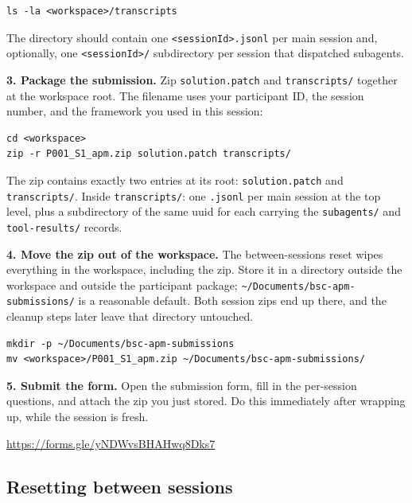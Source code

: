 \documentclass[11pt, a4paper]{article}
\begin{document}
\begin{verbatim}
ls -la <workspace>/transcripts
\end{verbatim}

The directory should contain one \texttt{<sessionId>.jsonl} per main session and, optionally, one \texttt{<sessionId>/} subdirectory per session that dispatched subagents.

\textbf{3. Package the submission.} Zip \texttt{solution.patch} and \texttt{transcripts/} together at the workspace root. The filename uses your participant ID, the session number, and the framework you used in this session:

\begin{verbatim}
cd <workspace>
zip -r P001_S1_apm.zip solution.patch transcripts/
\end{verbatim}

The zip contains exactly two entries at its root: \texttt{solution.patch} and \texttt{transcripts/}. Inside \texttt{transcripts/}: one \texttt{.jsonl} per main session at the top level, plus a subdirectory of the same uuid for each carrying the \texttt{subagents/} and \texttt{tool-results/} records.

\textbf{4. Move the zip out of the workspace.} The between-sessions reset wipes everything in the workspace, including the zip. Store it in a directory outside the workspace and outside the participant package; \texttt{\textasciitilde/Documents/bsc-apm-submissions/} is a reasonable default. Both session zips end up there, and the cleanup steps later leave that directory untouched.

\begin{verbatim}
mkdir -p ~/Documents/bsc-apm-submissions
mv <workspace>/P001_S1_apm.zip ~/Documents/bsc-apm-submissions/
\end{verbatim}

\textbf{5. Submit the form.} Open the submission form, fill in the per-session questions, and attach the zip you just stored. Do this immediately after wrapping up, while the session is fresh.

\begin{center}
\href{https://forms.gle/yNDWvsBHAHwq8Dks7}{https://forms.gle/yNDWvsBHAHwq8Dks7}
\end{center}

\subsection{Resetting between sessions}
\label{sec:between}
\end{document}
